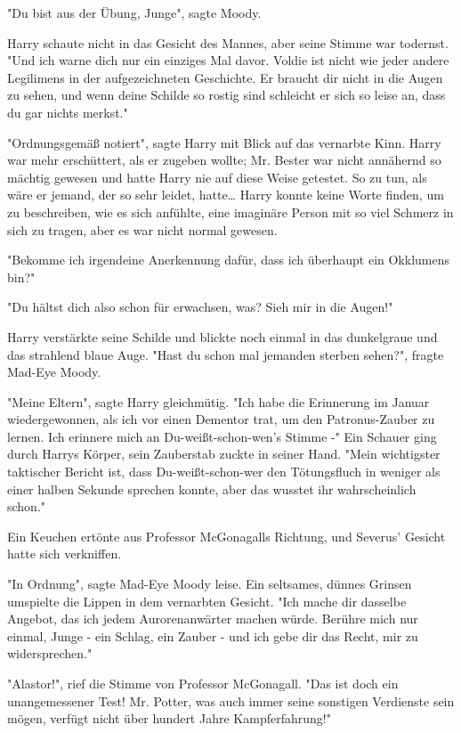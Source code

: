 {"Du bist aus der Übung, Junge", sagte Moody.

Harry schaute nicht in das Gesicht des Mannes, aber seine Stimme war todernst. "Und ich warne dich nur ein einziges Mal davor. Voldie ist nicht wie jeder andere Legilimens in der aufgezeichneten Geschichte. Er braucht dir nicht in die Augen zu sehen, und wenn deine Schilde so rostig sind schleicht er sich so leise an, dass du gar nichts merkst."

"Ordnungsgemäß notiert", sagte Harry mit Blick auf das vernarbte Kinn. Harry war mehr erschüttert, als er zugeben wollte; Mr. Bester war nicht annähernd so mächtig gewesen und hatte Harry nie auf diese Weise getestet. So zu tun, als wäre er jemand, der so sehr leidet, hatte… Harry konnte keine Worte finden, um zu beschreiben, wie es sich anfühlte, eine imaginäre Person mit so viel Schmerz in sich zu tragen, aber es war nicht normal gewesen.

"Bekomme ich irgendeine Anerkennung dafür, dass ich überhaupt ein Okklumens bin?"

"Du hältst dich also schon für erwachsen, was? Sieh mir in die Augen!"

Harry verstärkte seine Schilde und blickte noch einmal in das dunkelgraue und das strahlend blaue Auge. "Hast du schon mal jemanden sterben sehen?", fragte Mad-Eye Moody.

"Meine Eltern", sagte Harry gleichmütig. "Ich habe die Erinnerung im Januar wiedergewonnen, als ich vor einen Dementor trat, um den Patronus-Zauber zu lernen. Ich erinnere mich an Du-weißt-schon-wen's Stimme -" Ein Schauer ging durch Harrys Körper, sein Zauberstab zuckte in seiner Hand. "Mein wichtigster taktischer Bericht ist, dass Du-weißt-schon-wer den Tötungsfluch in weniger als einer halben Sekunde sprechen konnte, aber das wusstet ihr wahrscheinlich schon."

Ein Keuchen ertönte aus Professor McGonagalls Richtung, und Severus' Gesicht hatte sich verkniffen.

"In Ordnung", sagte Mad-Eye Moody leise. Ein seltsames, dünnes Grinsen umspielte die Lippen in dem vernarbten Gesicht. "Ich mache dir dasselbe Angebot, das ich jedem Aurorenanwärter machen würde. Berühre mich nur einmal, Junge - ein Schlag, ein Zauber - und ich gebe dir das Recht, mir zu widersprechen."

"Alastor!", rief die Stimme von Professor McGonagall. "Das ist doch ein unangemessener Test! Mr. Potter, was auch immer seine sonstigen Verdienste sein mögen, verfügt nicht über hundert Jahre Kampferfahrung!"

}
